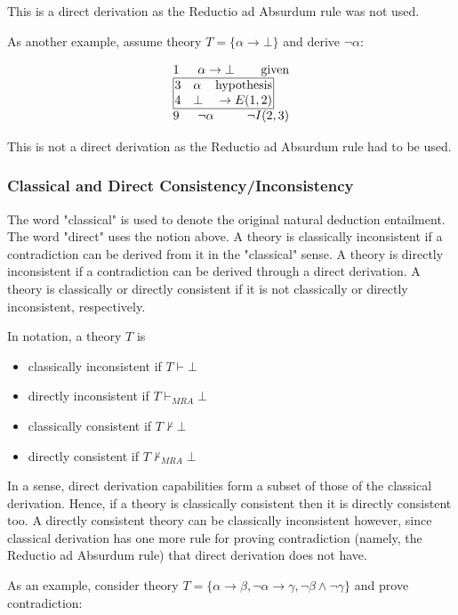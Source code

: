 \documentclass[11pt,twoside,a4paper]{report}
\begin{document}
This is a direct derivation as the Reductio ad Absurdum rule was not used.

As another example, assume theory $T = \{\alpha\rightarrow\bot\}$ and derive $\neg\alpha$:

\[\vbox{\offinterlineskip\halign{
&\tabskip=1.5em#\strut&$#$\hfil\tabskip=1em&\hfil$#$\tabskip=0em\cr
%
1&\alpha\rightarrow\bot&\mbox{given}\cr
%
\multispan3\vbox{\halign{
\vrule#&&\hskip.1em\tabskip=1em#\strut&$#$\hfil\tabskip=1em&\hfil$#$\hskip0.1em\tabskip=0em&\vrule#\cr
\noalign{\hrule}
%
&3&\alpha&\mbox{hypothesis}&\cr
&4&\bot&\rightarrow E(1,2)&\cr
%
\noalign{\hrule}}}\,\cr
%
9&\neg\alpha&\neg I(2,3)\cr
}}\]

This is not a direct derivation as the Reductio ad Absurdum rule had to be used.

\subsubsection{Classical and Direct Consistency/Inconsistency}
The word "classical" is used to denote the original natural deduction entailment. The word "direct" uses the notion above. A theory is classically inconsistent if a contradiction can be derived from it in the "classical" sense. A theory is directly inconsistent if a contradiction can be derived through a direct derivation. A theory is classically or directly consistent if it is not classically or directly inconsistent, respectively.

In notation, a theory $T$ is
\begin{itemize}
\item
classically inconsistent if $T\vdash\bot$
\item
directly inconsistent if $T\vdash_{MRA}\bot$
\item
classically consistent if $T\nvdash\bot$
\item
directly consistent if $T\nvdash_{MRA}\bot$
\end{itemize}

In a sense, direct derivation capabilities form a subset of those of the classical derivation. Hence, if a theory is classically consistent then it is directly consistent too. A directly consistent theory can be classically inconsistent however, since classical derivation has one more rule for proving contradiction (namely, the Reductio ad Absurdum rule) that direct derivation does not have.

As an example, consider theory $T = \{\alpha\rightarrow\beta, \neg\alpha\rightarrow\gamma, \neg\beta\wedge\neg\gamma\}$ and prove contradiction:
\end{document}
